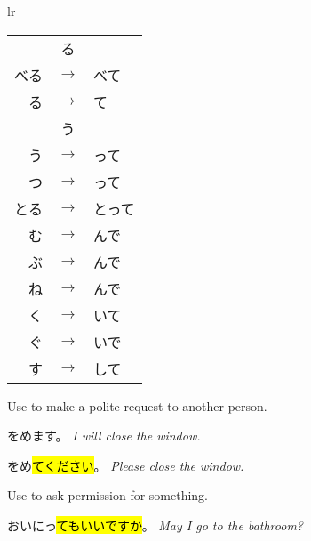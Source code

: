{\begin{tabular}{lr}
\begin{minipage}[b]{0.45\linewidth}
        \begin{tabular}{|rcl|}
            \hline
                              & る            & \hspace{1mm} \\
            \ruby{食}{た}べる & $\rightarrow$ & \ruby{食}{た}べて \\
            \ruby{見}{み}る   & $\rightarrow$ & \ruby{見}{み}て \\
            \hline
                              & う            & \hspace{1mm} \\
            \ruby{会}{あ}う   & $\rightarrow$ & \ruby{合}{あ}って \\
            \ruby{待}{ま}つ   & $\rightarrow$ & \ruby{待}{ま}って \\
            とる              & $\rightarrow$ & とって \\
            \ruby{読}{よ}む   & $\rightarrow$ & \ruby{読}{よ}んで \\
            \ruby{遊}{あそ}ぶ & $\rightarrow$ & \ruby{遊}{あそ}んで \\
            \ruby{死}{し}ね   & $\rightarrow$ & \ruby{死}{し}んで \\
            \ruby{書}{か}く   & $\rightarrow$ & \ruby{書}{か}いて \\
            \ruby{泳}{およ}ぐ & $\rightarrow$ & \ruby{泳}{およ}いで \\
            \ruby{話}{はな}す & $\rightarrow$ & \ruby{話}{はな}して \\
            \hline
        \end{tabular}
        \end{minipage}
   \end{tabular} 
    }

    {
    Use to make a polite request to another person.
    
    をめます。
    \textit{I will close the window.}
    
    をめ\hl{てください}。
    \textit{Please close the window.}
    }

    {
    Use to ask permission for something.

    おいにっ\hl{てもいいですか}。
    \textit{May I go to the bathroom?}
    }

